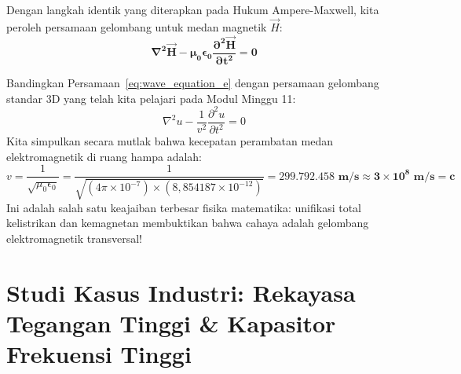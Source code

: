 \documentclass[11pt,a4paper]{article}
\theoremstyle{definition}
\begin{document}
Dengan langkah identik yang diterapkan pada Hukum Ampere-Maxwell, kita peroleh persamaan gelombang untuk medan magnetik $\vec{H}$:
\begin{equation}
    \mathbf{\nabla^2 \vec{H} - \mu_0 \epsilon_0 \frac{\partial^2 \vec{H}}{\partial t^2} = 0}
    \label{eq:wave_equation_h}
\end{equation}

Bandingkan Persamaan~\eqref{eq:wave_equation_e} dengan persamaan gelombang standar 3D yang telah kita pelajari pada Modul Minggu 11:
\begin{equation}
    \nabla^2 u - \frac{1}{v^2} \frac{\partial^2 u}{\partial t^2} = 0
\end{equation}
Kita simpulkan secara mutlak bahwa kecepatan perambatan medan elektromagnetik di ruang hampa adalah:
\begin{equation}
    v = \frac{1}{\sqrt{\mu_0 \epsilon_0}} = \frac{1}{\sqrt{(4\pi \times 10^{-7}) \times (8{,}854187 \times 10^{-12})}} = \mathbf{299.792.458\text{ m/s} \approx 3 \times 10^8\text{ m/s} = c}
\end{equation}
Ini adalah salah satu keajaiban terbesar fisika matematika: unifikasi total kelistrikan dan kemagnetan membuktikan bahwa cahaya adalah gelombang elektromagnetik transversal!

\section{Studi Kasus Industri: Rekayasa Tegangan Tinggi \& Kapasitor Frekuensi Tinggi}
\end{document}
